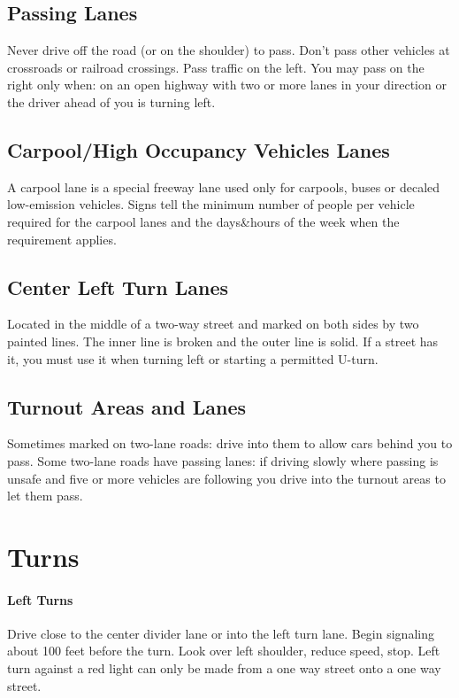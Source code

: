 \subsection{Passing Lanes}

Never drive off the road (or on the shoulder) to pass.
Don't pass other vehicles at crossroads or railroad crossings.
Pass traffic on the left.
You may pass on the right only when:
on an open highway with two or more lanes in your direction or
the driver ahead of you is turning left.

\subsection{Carpool/High Occupancy Vehicles Lanes}

A carpool lane is a special freeway lane used only for carpools,
buses or decaled low-emission vehicles.
Signs tell the minimum number of people per vehicle required
for the carpool lanes and the days\&hours of the week
when the requirement applies.

\subsection{Center Left Turn Lanes}

Located in the middle of a two-way street
and marked on both sides by two painted lines.
The inner line is broken and the outer line is solid.
If a street has it, you must use it when turning left
or starting a permitted U-turn.

\subsection{Turnout Areas and Lanes}

Sometimes marked on two-lane roads:
drive into them to allow cars behind you to pass.
Some two-lane roads have passing lanes:
if driving slowly where passing is unsafe
and five or more vehicles are following you
drive into the turnout areas to let them pass.


\section{Turns}

\paragraph{Left Turns}
Drive close to the center divider lane or into the left turn lane.
Begin signaling about 100 feet before the turn.
Look over left shoulder, reduce speed, stop.
Left turn against a red light can only be made from a one way street
onto a one way street.

